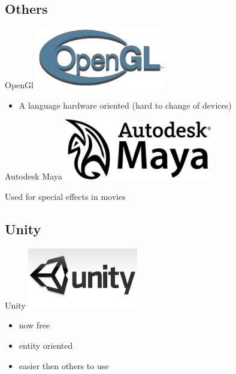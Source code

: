 \documentclass[a4paper,10pt]{beamer}
\begin{document}
			
		\subsection{Others}
		
			\begin{frame}{OpenGl}
				\includegraphics[height=75pt]{images/logos/OpenGL_logo.png}
				\begin{itemize}
					\item A language hardware oriented (hard to change of devices)
				\end{itemize}
			\end{frame}
			
			\begin{frame}{Autodesk Maya}
				\includegraphics[height=75pt]{images/logos/Autodesk_Maya.png}
				
				Used for special effects in movies
			\end{frame}
			
		\subsection{Unity}
		
			\begin{frame}{Unity}
				\includegraphics[height=75pt]{images/logos/Logo_Unity.jpg}
				\begin{itemize}
					\item now free
					\item entity oriented
					\item easier then others to use
				\end{itemize}
			\end{frame}
			
\end{document}
